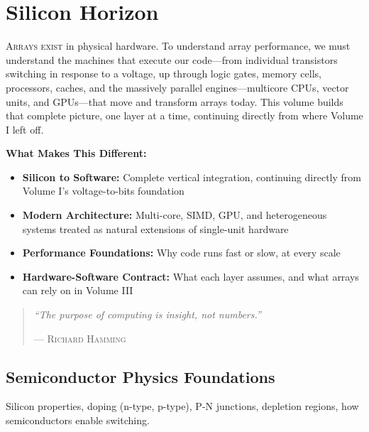 \part{Silicon Horizon}
\label{part:silicon-horizon}

\begin{volumesintro}
\lettrine[lines=3]{A}{rrays exist} in physical hardware. To understand array performance, we must understand the machines that execute our code---from individual transistors switching in response to a voltage, up through logic gates, memory cells, processors, caches, and the massively parallel engines---multicore CPUs, vector units, and GPUs---that move and transform arrays today. This volume builds that complete picture, one layer at a time, continuing directly from where Volume I left off.

\vspace{1em}
\textbf{What Makes This Different:}
\begin{itemize}[noitemsep]
    \item \textbf{Silicon to Software:} Complete vertical integration, continuing directly from Volume I's voltage-to-bits foundation
    \item \textbf{Modern Architecture:} Multi-core, SIMD, GPU, and heterogeneous systems treated as natural extensions of single-unit hardware
    \item \textbf{Performance Foundations:} Why code runs fast or slow, at every scale
    \item \textbf{Hardware-Software Contract:} What each layer assumes, and what arrays can rely on in Volume III
\end{itemize}

\begin{quote}
\textit{``The purpose of computing is insight, not numbers.''}

\hfill--- \textsc{Richard Hamming}
\end{quote}
\end{volumesintro}


\chapter{Semiconductor Physics Foundations}
Silicon properties, doping (n-type, p-type), P-N junctions, depletion regions, how semiconductors enable switching.


